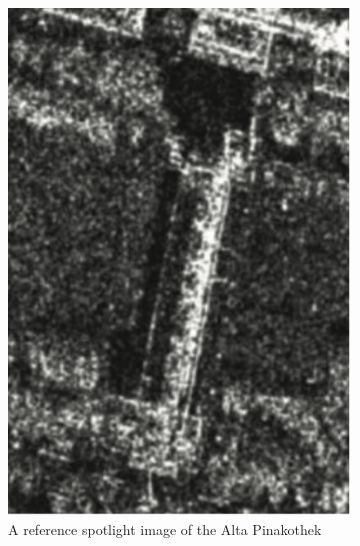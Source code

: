 \begin{figure}
\centering
\begin{subfigure}{.5\textwidth}
	\centering
	\includegraphics[width=0.9\linewidth]{../figures/auer_2008_terrasar_ref}
	\caption{A reference spotlight image of the Alta Pinakothek}
	\label{fig:auer_2008_ref}
\end{subfigure}%
\begin{subfigure}{.5\textwidth}
	\centering

\end{subfigure}
\end{figure}
